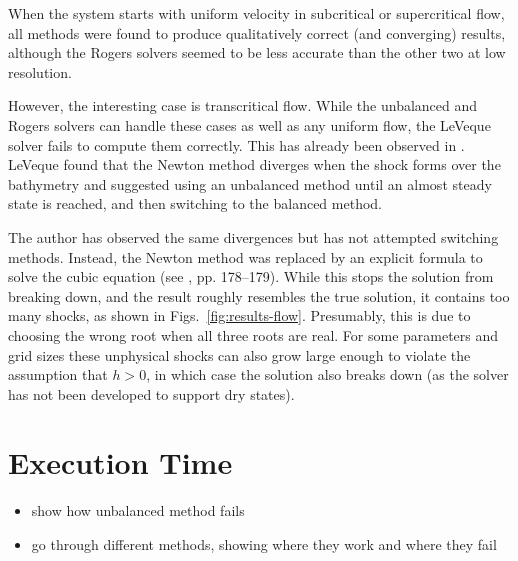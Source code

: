 When the system starts with uniform velocity in subcritical or supercritical flow, all methods were found to produce qualitatively correct (and converging) results, although the Rogers solvers seemed to be less accurate than the other two at low resolution.

However, the interesting case is transcritical flow. While the unbalanced and Rogers solvers can handle these cases as well as any uniform flow, the LeVeque solver fails to compute them correctly. This has already been observed in \citet{leveque1998balancing}. LeVeque found that the Newton method diverges when the shock forms over the bathymetry and suggested using an unbalanced method until an almost steady state is reached, and then switching to the balanced method.

The author has observed the same divergences but has not attempted switching methods. Instead, the Newton method was replaced by an explicit formula to solve the cubic equation (see \citet{press2007numerical}, pp. 178--179). While this stops the solution from breaking down, and the result roughly resembles the true solution, it contains too many shocks, as shown in Figs.~\ref{fig:results-flow}. Presumably, this is due to choosing the wrong root when all three roots are real. For some parameters and grid sizes these unphysical shocks can also grow large enough to violate the assumption that $h > 0$, in which case the solution also breaks down (as the solver has not been developed to support dry states).

\section{Execution Time}

\begin{itemize}
  \item show how unbalanced method fails
  \item go through different methods, showing where they work and where they fail
\end{itemize}